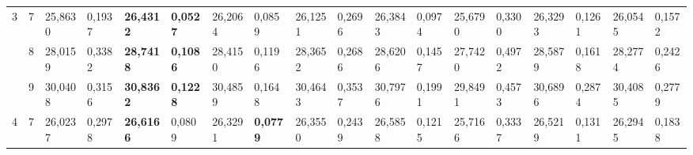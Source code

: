\documentclass[conference]{IEEEtran}
\begin{document}
\begin{table*}[]
\begin{tabular}{|cc|ll|ll|ll|ll|ll|ll|ll|ll|}
		\multicolumn{1}{|c|}{\multirow{3}{*}{3}}  & 7          & \multicolumn{1}{l|}{25,8630}           & 0,1937                            & \multicolumn{1}{l|}{\textbf{26,4312}}  & \textbf{0,0527}                   & \multicolumn{1}{l|}{26,2064}           & 0,0859                            & \multicolumn{1}{l|}{26,1251}           & 0,2696                            & \multicolumn{1}{l|}{26,3843}           & 0,0974                            & \multicolumn{1}{l|}{25,6790}           & 0,3300                            & \multicolumn{1}{l|}{26,3293}           & 0,1261                            & \multicolumn{1}{l|}{26,0545}           & 0,1572                            \\ \cline{2-18} 
		\multicolumn{1}{|c|}{}                    & 8          & \multicolumn{1}{l|}{28,0159}           & 0,3382                            & \multicolumn{1}{l|}{\textbf{28,7418}}  & \textbf{0,1086}                   & \multicolumn{1}{l|}{28,4150}           & 0,1196                            & \multicolumn{1}{l|}{28,3652}           & 0,2686                            & \multicolumn{1}{l|}{28,6206}           & 0,1457                            & \multicolumn{1}{l|}{27,7420}           & 0,4972                            & \multicolumn{1}{l|}{28,5879}           & 0,1618                            & \multicolumn{1}{l|}{28,2774}           & 0,2426                            \\ \cline{2-18} 
		\multicolumn{1}{|c|}{}                    & 9          & \multicolumn{1}{l|}{30,0408}           & 0,3156                            & \multicolumn{1}{l|}{\textbf{30,8362}}  & \textbf{0,1228}                   & \multicolumn{1}{l|}{30,4859}           & 0,1648                            & \multicolumn{1}{l|}{30,4643}           & 0,3537                            & \multicolumn{1}{l|}{30,7976}           & 0,1991                            & \multicolumn{1}{l|}{29,8491}           & 0,4573                            & \multicolumn{1}{l|}{30,6896}           & 0,2874                            & \multicolumn{1}{l|}{30,4085}           & 0,2779                            \\ \hline
		\multicolumn{1}{|c|}{\multirow{3}{*}{4}}  & 7          & \multicolumn{1}{l|}{26,0237}           & 0,2978                            & \multicolumn{1}{l|}{\textbf{26,6166}}  & 0,0809                            & \multicolumn{1}{l|}{26,3291}           & \textbf{0,0779}                   & \multicolumn{1}{l|}{26,3550}           & 0,2439                            & \multicolumn{1}{l|}{26,5858}           & 0,1215                            & \multicolumn{1}{l|}{25,7166}           & 0,3337                            & \multicolumn{1}{l|}{26,5219}           & 0,1311                            & \multicolumn{1}{l|}{26,2945}           & 0,1838                            \\ \cline{2-18} 

\end{tabular}
\end{table*}
\end{document}
